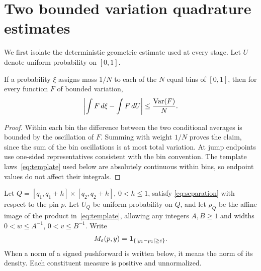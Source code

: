 \section{Two bounded variation quadrature estimates}\label{sec:quadrature}
We first isolate the deterministic geometric estimate used at every stage.
Let $U$ denote uniform probability on $[0,1]$.

\begin{lemma}\label{lem:BV}
If a probability $\xi$ assigns mass $1/N$ to each of the $N$ equal bins
of $[0,1]$, then for every function $F$ of bounded variation,
\begin{equation}\label{eq:BV}
 \left|\int F\,d\xi-\int F\,dU\right|\leq\frac{\operatorname{Var}(F)}N.
\end{equation}
\end{lemma}
\begin{proof}
Within each bin the difference between the two conditional averages is
bounded by the oscillation of $F$. Summing with weight $1/N$ proves the
claim, since the sum of the bin oscillations is at most total variation.
At jump endpoints use one-sided representatives consistent with the bin
convention. The template laws~\eqref{eq:template} used below are absolutely
continuous within bins, so endpoint values do not affect their integrals.
\end{proof}

Let $Q=[q_1,q_1+h]\times[q_2,q_2+h]$, $0<h\leq1$, satisfy
\eqref{eq:separation} with respect to the pin $p$. Let $U_Q$ be uniform
probability on $Q$, and let $\rho_Q$ be the affine image of the product
in~\eqref{eq:template}, allowing any integers $A,B\geq1$ and widths
$0<w\leq A^{-1}$, $0<v\leq B^{-1}$. Write
\[
 M_\varepsilon(p,y)=\mathbf 1_{\{|y_1-p_1|\geq\varepsilon\}}.
\]
When a norm of a signed pushforward is written below, it means the norm of
its density. Each constituent measure is positive and unnormalized.

